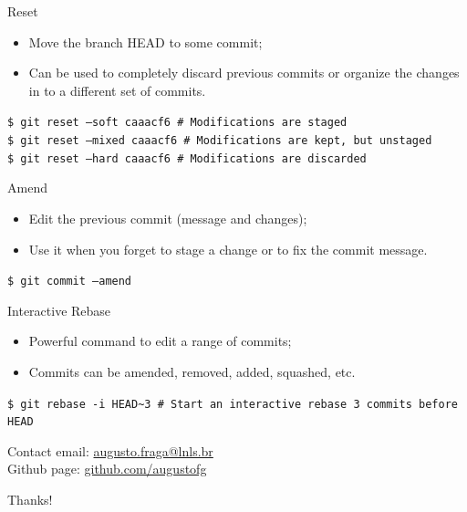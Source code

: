\documentclass{beamer}
\begin{document}
\begin{frame}{Reset}
  \begin{itemize}
    \item Move the branch HEAD to some commit;
    \item Can be used to completely discard previous commits or organize the changes in to a different set of commits.
  \end{itemize}
  \begin{block}{}
    \texttt{\$ git reset --soft caaacf6 \# Modifications are staged} \\
    \texttt{\$ git reset --mixed caaacf6 \# Modifications are kept, but unstaged} \\
    \texttt{\$ git reset --hard caaacf6 \# Modifications are discarded}
  \end{block}
\end{frame}

\begin{frame}{Amend}
  \begin{itemize}
    \item Edit the previous commit (message and changes);
    \item Use it when you forget to stage a change or to fix the commit message.
  \end{itemize}
  \begin{block}{}
    \texttt{\$ git commit --amend}
  \end{block}
\end{frame}

\begin{frame}{Interactive Rebase}
  \begin{itemize}
    \item Powerful command to edit a range of commits;
    \item Commits can be amended, removed, added, squashed, etc.
  \end{itemize}
  \begin{block}{}
    \texttt{\$ git rebase -i HEAD\textasciitilde{}3 \# Start an interactive rebase 3 commits before HEAD}
  \end{block}
\end{frame}

\begin{frame}{Contact}
  email: \href{mailto:augusto.fraga@lnls.br}{augusto.fraga@lnls.br} \\
  Github page: \url{github.com/augustofg} \\
  \begin{center}
    Thanks!
  \end{center}
\end{frame}
\end{document}
